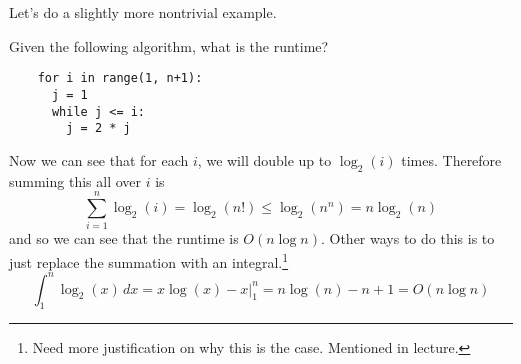 Let's do a slightly more nontrivial example. 

\begin{example}
  Given the following algorithm, what is the runtime? 
  \begin{lstlisting}
    for i in range(1, n+1): 
      j = 1 
      while j <= i: 
        j = 2 * j
  \end{lstlisting}
  Now we can see that for each $i$, we will double up to $\log_2 (i)$ times. Therefore summing this all over $i$ is 
  \begin{equation}
    \sum_{i = 1}^n \log_2 (i) = \log_2 (n!) \leq \log_2 (n^n) = n \log_2 (n)
  \end{equation}
  and so we can see that the runtime is $O(n \log n)$. Other ways to do this is to just replace the summation with an integral.\footnote{Need more justification on why this is the case. Mentioned in lecture.} 
  \begin{equation}
    \int_1^n \log_2 (x) \,dx = x \log(x) - x \big|_1^n = n \log(n) - n + 1 = O(n \log n)
  \end{equation}
\end{example}

